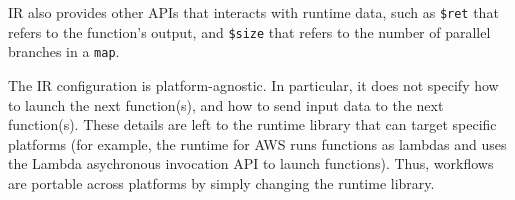 \name{} IR also provides other APIs that interacts with runtime data, such as
\texttt{\$ret} that refers to the function's output, and \texttt{\$size} that
refers to the number of parallel branches in a \texttt{map}.








The IR configuration is platform-agnostic. In particular, it does not specify
how to launch the next function(s), and how to send input data to the next
function(s). These details are left to the \name{} runtime library that can
target specific platforms (for example, the runtime for AWS runs functions as
lambdas and uses the Lambda asychronous invocation API to launch functions).
Thus, workflows are portable across platforms by simply changing the runtime
library.






